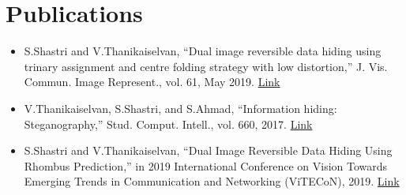 \documentclass[a4paper,11pt]{article}
\begin{document}
\section{Publications}
	\begin{itemize}[leftmargin=*, itemsep = -4pt]
    \item{S.Shastri and V.Thanikaiselvan, “Dual image reversible data hiding using trinary assignment and centre folding strategy with low distortion,” J. Vis. Commun. Image Represent., vol. 61, May 2019. \href{https://doi.org/10.1016/j.jvcir.2019.03.022}{Link}}
		\item{V.Thanikaiselvan, S.Shastri, and S.Ahmad, “Information hiding: Steganography,” Stud. Comput. Intell., vol. 660, 2017. \href{https://doi.org/10.1007/978-3-319-44790-2\_4}{Link}}
    \item{S.Shastri and V.Thanikaiselvan, “Dual Image Reversible Data Hiding Using Rhombus Prediction,” in 2019 International Conference on Vision Towards Emerging Trends in Communication and Networking (ViTECoN), 2019. \href{https://doi.org/10.1109/ViTECoN.2019.8899667}{Link}}
   \end{itemize}
\end{document}
